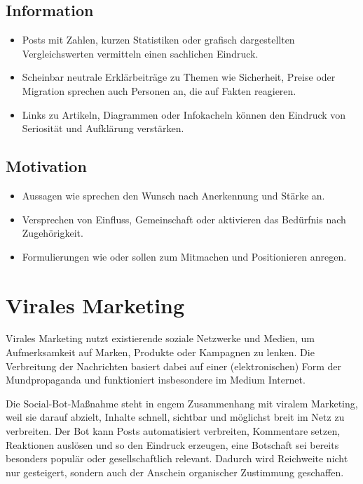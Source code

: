 \subsection{Information}
\label{sec:04-05-05_information}

\begin{itemize}
    \item Posts mit Zahlen, kurzen Statistiken oder grafisch dargestellten Vergleichswerten vermitteln einen sachlichen Eindruck.
    \item Scheinbar neutrale Erklärbeiträge zu Themen wie Sicherheit, Preise oder Migration sprechen auch Personen an, die auf Fakten reagieren.
    \item Links zu Artikeln, Diagrammen oder Infokacheln können den Eindruck von Seriosität und Aufklärung verstärken.
\end{itemize}

\subsection{Motivation}
\label{sec:04-05-06_motivation}

\begin{itemize}
    \item Aussagen wie  sprechen den Wunsch nach Anerkennung und Stärke an.
    \item Versprechen von Einfluss, Gemeinschaft oder  aktivieren das Bedürfnis nach Zugehörigkeit.
    \item Formulierungen wie  oder  sollen zum Mitmachen und Positionieren anregen.
\end{itemize}

\section{Virales Marketing}
\label{sec:04-06_viral-marketing}

Virales Marketing nutzt existierende soziale Netzwerke und Medien, um Aufmerksamkeit auf Marken, Produkte oder Kampagnen zu lenken. Die Verbreitung der Nachrichten basiert dabei auf einer (elektronischen) Form der Mundpropaganda und funktioniert insbesondere im Medium Internet. \cite[S. 67 ff.]{002_MKO03_communication-communication-goals-and-advertising-conception}

Die Social-Bot-Maßnahme steht in engem Zusammenhang mit viralem Marketing, weil sie darauf abzielt, Inhalte schnell, sichtbar und möglichst breit im Netz zu verbreiten. Der Bot kann Posts automatisiert verbreiten, Kommentare setzen, Reaktionen auslösen und so den Eindruck erzeugen, eine Botschaft sei bereits besonders populär oder gesellschaftlich relevant. Dadurch wird Reichweite nicht nur gesteigert, sondern auch der Anschein organischer Zustimmung geschaffen.
	
